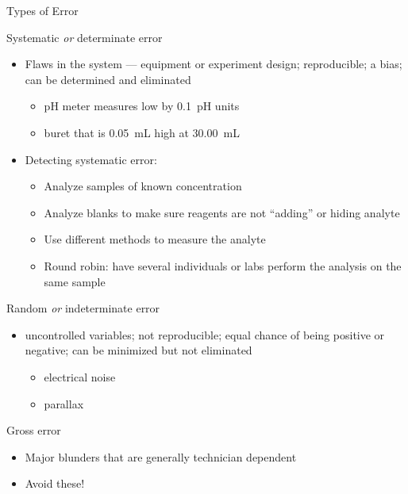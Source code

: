 \documentclass[notes=only]{beamer}
\begin{document}
\begin{frame}[c,allowframebreaks]{Types of Error}

	\begin{block}{Systematic \emph{or} determinate error}
			\begin{itemize}
				\item Flaws in the system --- equipment or
					experiment design;
					\alert{reproducible}; a bias; can be
					\alert{determined} and eliminated
					\begin{itemize}
						\item pH meter measures low by
							0.1~pH units
						\item buret that is
							\SI{0.05}{\mL} high at
							\SI{30.00}{\mL}
					\end{itemize}
				\item Detecting systematic error:
					\begin{itemize}
						\item Analyze samples of known
							concentration
						\item Analyze blanks to make
							sure reagents are not
							``adding'' or hiding
							analyte
						\item Use different methods to measure the analyte
						\item Round robin:  have several individuals or labs perform the analysis on the same sample
					\end{itemize}
			\end{itemize}
		\end{block}

		\framebreak

			\begin{block}{Random \emph{or} indeterminate error}
				\begin{itemize}
					\item uncontrolled variables; not reproducible; equal chance of being positive or negative; can be minimized but not eliminated
						\begin{itemize}
							\item electrical noise
							\item parallax
						\end{itemize}
				\end{itemize}
			\end{block}

			\begin{block}{Gross error}
				\begin{itemize}
					\item Major blunders that are generally technician dependent
					\item \alert{Avoid these!}
				\end{itemize}
			\end{block}
\end{frame}
\end{document}
